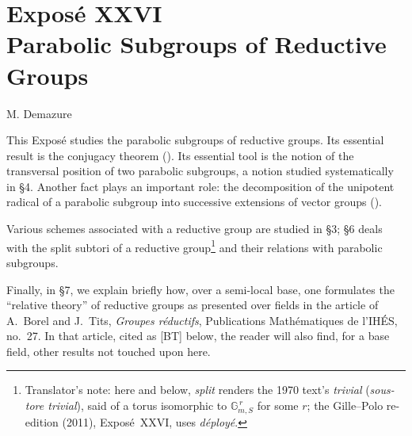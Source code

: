 \chapter*{Exposé XXVI\\Parabolic Subgroups of Reductive Groups}
\begin{center}
\large M. Demazure
\end{center}

\medskip

This Exposé studies the parabolic subgroups of reductive groups.
Its essential result is the conjugacy theorem ().  Its essential tool is
the notion of the transversal position of two parabolic subgroups, a notion
studied systematically in §4.  Another fact plays an important role: the
decomposition of the unipotent radical of a parabolic subgroup into
successive extensions of vector groups
().

Various schemes associated with a reductive group are studied in §3; §6
deals with the split subtori of a reductive group\footnote{Translator's note: here and below, \emph{split} renders the 1970
text's \emph{trivial} (\emph{sous-tore trivial}), said of a torus isomorphic
to \(\mathbb G_{m,S}^{\,r}\) for some \(r\); the Gille--Polo re-edition (2011),
Exposé~XXVI, uses \emph{déployé}.} and their relations
with parabolic subgroups.

Finally, in §7, we explain briefly how, over a semi-local base, one formulates
the ``relative theory'' of reductive groups as presented over fields in the
article of A.~Borel and J.~Tits, \emph{Groupes réductifs}, Publications
Mathématiques de l'IHÉS, no.~27.  In that article, cited as [BT] below, the
reader will also find, for a base field, other results not touched upon here.


